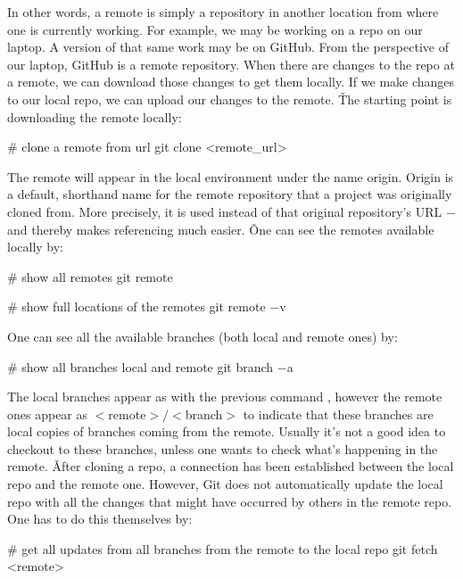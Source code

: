 In other words, a remote is simply a repository in another location from where one is currently working. For example,
we may be working on a repo on our laptop. A version of that same work may be on GitHub. From the perspective of our
laptop, GitHub is a remote repository. When there are changes to the repo at a remote, we can download those changes
to get them locally. If we make changes to our local repo, we can upload our changes to the remote. \v

The starting point is downloading the remote locally:

\begin{bash}
# clone a remote from url
git clone <remote_url>
\end{bash}

The remote will appear in the local environment under the name origin. Origin is a default, shorthand name for the
remote repository that a project was originally cloned from. More precisely, it is used instead of that original
repository's URL $-$ and thereby makes referencing much easier. \v

One can see the remotes available locally by:

\begin{bash}
# show all remotes
git remote
\end{bash}

\begin{bash}
# show full locations of the remotes
git remote $-$v
\end{bash}

One can see all the available branches (both local and remote ones) by:

\begin{bash}
# show all branches local and remote
git branch $-$a
\end{bash}

The local branches appear as with the previous command , however the remote ones appear as
$<$remote$>/<$branch$>$ to indicate that these branches are local copies of branches coming from the remote. Usually
it's not a good idea to checkout to these branches, unless one wants to check what's happening in the remote. \v

After cloning a repo, a connection has been established between the local repo and the remote one. However, Git does
not automatically update the local repo with all the changes that might have occurred by others in the remote repo.
One has to do this themselves by:

\begin{bash}
# get all updates from all branches from the remote to the local repo
git fetch <remote>
\end{bash}

